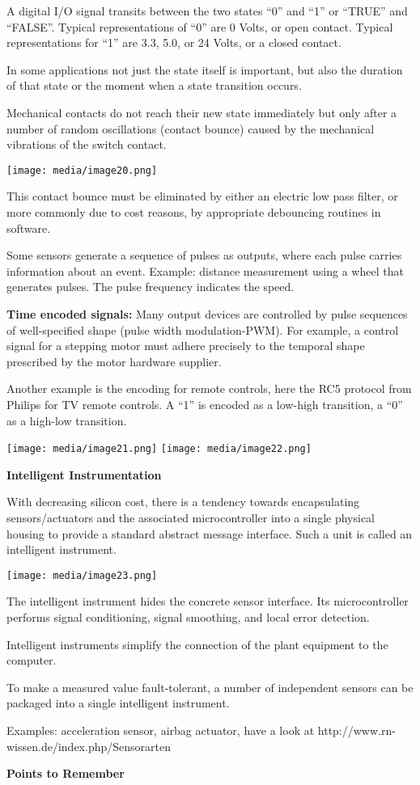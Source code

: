 A digital I/O signal transits between the two states ``0'' and ``1'' or
``TRUE'' and ``FALSE''. Typical representations of ``0'' are 0 Volts, or
open contact. Typical representations for ``1'' are 3.3, 5.0, or 24
Volts, or a closed contact.

In some applications not just the state itself is important, but also
the duration of that state or the moment when a state transition occurs.

Mechanical contacts do not reach their new state immediately but only
after a number of random oscillations (contact bounce) caused by the
mechanical vibrations of the switch contact.

\texttt{[image: media/image20.png]}

This contact bounce must be eliminated by either an electric low pass
filter, or more commonly due to cost reasons, by appropriate debouncing
routines in software.

Some sensors generate a sequence of pulses as outputs, where each pulse
carries information about an event. Example: distance measurement using
a wheel that generates pulses. The pulse frequency indicates the speed.

\textbf{Time encoded signals:} Many output devices are controlled by
pulse sequences of well-specified shape (pulse width modulation-PWM).
For example, a control signal for a stepping motor must adhere precisely
to the temporal shape prescribed by the motor hardware supplier.

Another example is the encoding for remote controls, here the RC5
protocol from Philips for TV remote controls. A ``1'' is encoded as a
low-high transition, a ``0'' as a high-low transition.

\texttt{[image: media/image21.png]}
\texttt{[image: media/image22.png]}

\textbf{Intelligent Instrumentation}

With decreasing silicon cost, there is a tendency towards encapsulating
sensors/actuators and the associated microcontroller into a single
physical housing to provide a standard abstract message interface. Such
a unit is called an intelligent instrument.

\texttt{[image: media/image23.png]}

The intelligent instrument hides the concrete sensor interface. Its
microcontroller performs signal conditioning, signal smoothing, and
local error detection.

Intelligent instruments simplify the connection of the plant equipment
to the computer.

To make a measured value fault-tolerant, a number of independent sensors
can be packaged into a single intelligent instrument.

Examples: acceleration sensor, airbag actuator, have a look at
http://www.rn-wissen.de/index.php/Sensorarten

\protect\hypertarget{teil8}{}{}\textbf{Points to Remember}
